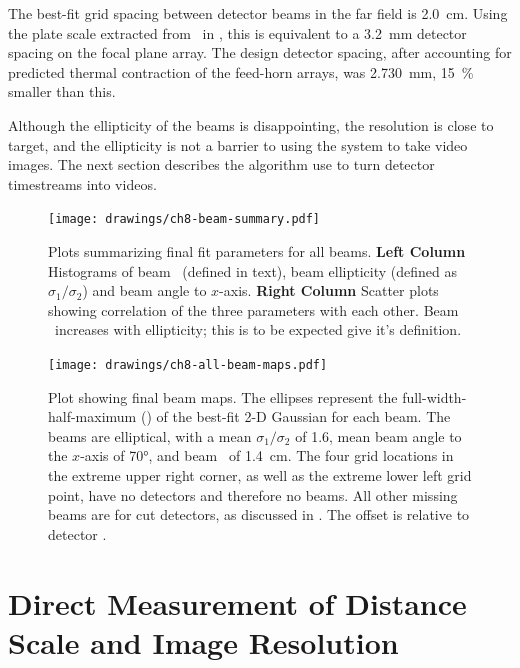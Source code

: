 The best-fit grid spacing between detector beams in the far field is \SI{2.0}{\cm}.
Using the plate scale extracted from \ZEMAX\ in , this is equivalent to a \SI{3.2}{\mm} detector spacing on the focal plane array.
The design detector spacing, after accounting for predicted thermal contraction of the feed-horn arrays, was \SI{2.730}{\mm}, \SI{15}{\percent} smaller than this.

Although the ellipticity of the beams is disappointing, the resolution is close to target, and the ellipticity is not a barrier to using the system to take video images. The next section describes the algorithm use to turn detector timestreams into videos.

\begin{figure}[th]
\centering
\texttt{[image: drawings/ch8-beam-summary.pdf]}
\caption{
  Plots summarizing final fit parameters for all beams.
  \textbf{Left Column} Histograms of beam \FWHM\ (defined in text), beam ellipticity (defined as $\sigma_1 / \sigma_2$) and beam angle to $x$-axis.
  \textbf{Right Column} Scatter plots showing correlation of the three parameters with each other. Beam \FWHM\ increases with ellipticity; this is to be expected give it's definition.
}
\label{fig:ch8-beam-summary}
\end{figure}

\begin{figure}[th]
\centering
\texttt{[image: drawings/ch8-all-beam-maps.pdf]}
\caption{
Plot showing final beam maps.
The ellipses represent the full-width-half-maximum (\FWHM) of the best-fit 2-D Gaussian for each beam. The beams are elliptical, with a mean $\sigma_1/\sigma_2$ of 1.6, mean beam angle to the $x$-axis of \ang{70}, and beam \FWHM\ of \SI{1.4}{\cm}.
The four grid locations in the extreme upper right corner, as well as the extreme lower left grid point, have no detectors and therefore no beams. All other missing beams are for cut detectors, as discussed in .
The offset is relative to detector .
}
\label{fig:ch8-all-beam-maps}
\end{figure}

\section{Direct Measurement of Distance Scale and Image Resolution} \label{sec:ch8-dist-scale}

